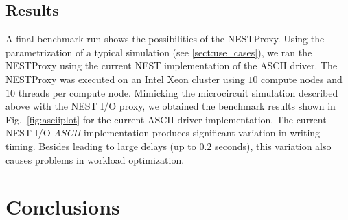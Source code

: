 \documentclass[]{YIC2015}
\begin{document}
\subsection{Results}

A final benchmark run shows the possibilities of the NESTProxy.  Using
the parametrization of a typical simulation (see
\ref{sect:use_cases}), we ran the NESTProxy using the current NEST
implementation of the ASCII driver.
The NESTProxy was executed on an Intel Xeon cluster using $10$ compute
nodes and $10$ threads per compute node. Mimicking the microcircuit
simulation described above with the NEST I/O proxy, we obtained the
benchmark results shown in Fig.~\ref{fig:asciiplot} for the current
ASCII driver implementation. The current NEST I/O \emph{ASCII}
implementation produces significant variation in writing timing.
Besides leading to large delays (up to $0.2$ seconds), this variation
also causes problems in workload optimization.


\section{Conclusions}
\end{document}
